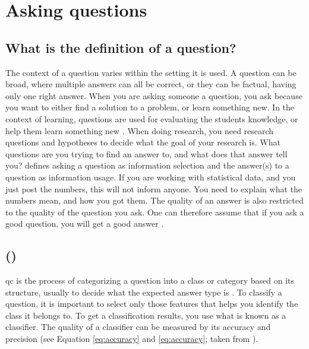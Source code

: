 \section{Asking questions}
\label{sec:asking_questions}

\subsection{What is the definition of a question?}
\label{sec:question_definition}
The context of a question varies within the setting it is used. 
A question can be broad, where multiple answers can all be correct, or they can be factual, having only one right answer. 
When you are asking someone a question, you ask because you want to either find a solution to a problem, or learn something new. 
In the context of learning, questions are used for evaluating the students knowledge, or help them learn something new \textcite{Nielsen2008}.
\vspace{0.5em}\newline
When doing research, you need research questions and hypotheses to decide what the goal of your research is. 
What questions are you trying to find an answer to, and what does that answer tell you?
\textcite{Slowiaczek1992} defines asking a question as information selection and the answer(s) to a question as information usage. 
If you are working with statistical data, and you just post the numbers, this will not inform anyone. 
You need to explain what the numbers mean, and how you got them.
The quality of an answer is also restricted to the quality of the question you ask. 
One can therefore assume that if you ask a good question, you will get a good answer \cite{Slowiaczek1992}. 

\subsection[Question classification]{ ()}
\label{sec:question_classification}
\gls{qc} is the process of categorizing a question into a class or category based on its structure, usually to decide what the expected answer type is \cite{Li, Loni2011, Lopez2011}. 
To classify a question, it is important to select only those features that helps you identify the class it belongs to.
To get a classification results, you use what is known as a classifier. 
The quality of a classifier can be measured by its accuracy and precision (see Equation \ref{eq:accuracy} and \ref{eq:accuracy}; taken from \cite[p.~13]{Li}).


